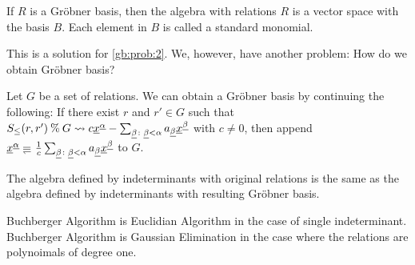 \begin{remark}
  If $R$ is a Gr\"obner basis,
  then
  the algebra with relations $R$ is a vector space with the basis $B$.
  Each element in $B$ is called a standard monomial.
\end{remark}

This is a solution for \cref{gb:prob:2}.
We, however, have another problem:
How do we obtain Gr\"obner basis?


\begin{theorem}
  Let $G$ be a set of relations.
  We can obtain a Gr\"obner basis by continuing the following:
  If there exist $r$ and $r' \in G$
  such that $S_{\leq}(r,r')\mathbin{\%} G\leadsto c{\underline{x}}^{\underline{\alpha}}-\sum_{{\underline{\beta}}\colon {\underline{\beta}}<\alpha} a_{\underline{\beta}} {\underline{x}}^{\underline{\beta}}$ with $c\neq 0$,
  then append $\xxx^\aaalpha\denotes \frac{1}{c}\sum_{\bbbeta\colon \bbbeta<\alpha} a_\bbbeta \xxx^\bbbeta$
  to $G$.

  The algebra defined by indeterminants with original relations
  is the same as the algebra defined by indeterminants with resulting Gr\"obner basis.
\end{theorem}

\begin{remark}
  Buchberger Algorithm is Euclidian Algorithm  in the case of single indeterminant.
  Buchberger Algorithm is Gaussian Elimination
  in the case where the relations are polynoimals of degree one.
\end{remark}

